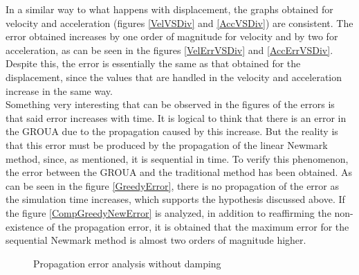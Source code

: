 \documentclass{ws-m3as}
\begin{document}
In a similar way to what happens with displacement, the graphs obtained for velocity and acceleration (figures \ref{VelVSDiv} and \ref{AccVSDiv}) are consistent. The error obtained increases by one order of magnitude for velocity and by two for acceleration, as can be seen in the figures \ref{VelErrVSDiv} and \ref{AccErrVSDiv}. Despite this, the error is essentially the same as that obtained for the displacement, since the values that are handled in the velocity and acceleration increase in the same way.\\

Something very interesting that can be observed in the figures of the errors is that said error increases with time. It is logical to think that there is an error in the GROUA due to the propagation caused by this increase. But the reality is that this error must be produced by the propagation of the linear Newmark method, since, as mentioned, it is sequential in time. To verify this phenomenon, the error between the GROUA and the traditional method has been obtained. As can be seen in the figure \ref{GreedyError}, there is no propagation of the error as the simulation time increases, which supports the hypothesis discussed above. If the figure \ref{CompGreedyNewError} is analyzed, in addition to reaffirming the non-existence of the propagation error, it is obtained that the maximum error for the sequential Newmark method is almost two orders of magnitude higher.




\begin{figure}
 \centering
 \caption{Propagation error analysis without damping}
 \label{PropError}
\end{figure}
\end{document}
